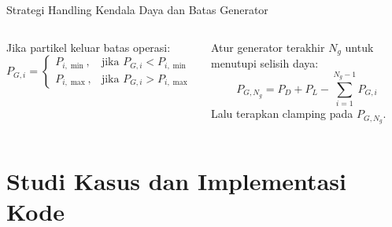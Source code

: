 \documentclass[10pt,aspectratio=169]{beamer}
\begin{document}
\begin{frame}{Strategi Handling Kendala Daya dan Batas Generator}
    \begin{columns}
        \begin{tcolorbox}[colback=white,colframe=unibblue,title=\textbf{1. Clamping Batas Daya}]
            Jika partikel keluar batas operasi:
            \[
                P_{G,i} = 
                \begin{cases}
                    P_{i,\min}, & \text{jika } P_{G,i} < P_{i,\min} \\
                    P_{i,\max}, & \text{jika } P_{G,i} > P_{i,\max}
                \end{cases}
            \]
        \end{tcolorbox}

        \begin{tcolorbox}[colback=white,colframe=darkgreen,title=\textbf{2. Repair Mechanism (Slack Generator)}]
            Atur generator terakhir $N_g$ untuk menutupi selisih daya:
            \[
                P_{G,N_g} = P_D + P_L - \sum_{i=1}^{N_g-1} P_{G,i}
            \]
            Lalu terapkan clamping pada $P_{G,N_g}$.
        \end{tcolorbox}
    \end{columns}
\end{frame}

\section{Studi Kasus dan Implementasi Kode}
\end{document}
